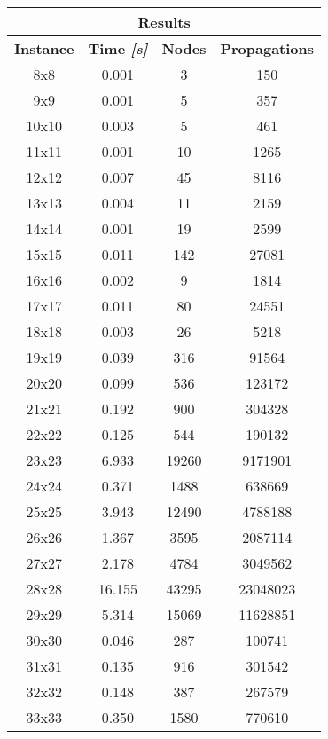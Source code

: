 \begin{center}
    \begin{tabular}{|c|c|c|c|}
        \hline
        \multicolumn{4}{|c|}{\textbf{Results}} \\
        \hline
        \textbf{Instance} & \textbf{Time \textit{[s]}} & \textbf{Nodes} & \textbf{Propagations} \\
        \hline
        8x8 & 0.001 & 3 & 150 \\ \hline
        9x9 & 0.001 & 5 & 357 \\ \hline
        10x10 & 0.003 & 5 & 461 \\ \hline
        11x11 & 0.001 & 10 & 1265 \\ \hline
        12x12 & 0.007 & 45 & 8116 \\ \hline
        13x13 & 0.004 & 11 & 2159 \\ \hline
        14x14 & 0.001 & 19 & 2599 \\ \hline
        15x15 & 0.011 & 142 & 27081 \\ \hline
        16x16 & 0.002 & 9 & 1814 \\ \hline
        17x17 & 0.011 & 80 & 24551 \\ \hline
        18x18 & 0.003 & 26 & 5218 \\ \hline
        19x19 & 0.039 & 316 & 91564 \\ \hline
        20x20 & 0.099 & 536 & 123172 \\ \hline
        21x21 & 0.192 & 900 & 304328 \\ \hline
        22x22 & 0.125 & 544 & 190132 \\ \hline
        23x23 & 6.933 & 19260 & 9171901 \\ \hline
        24x24 & 0.371 & 1488 & 638669 \\ \hline
        25x25 & 3.943 & 12490 & 4788188 \\ \hline
        26x26 & 1.367 & 3595 & 2087114 \\ \hline
        27x27 & 2.178 & 4784 & 3049562 \\ \hline
        28x28 & 16.155 & 43295 & 23048023 \\ \hline
        29x29 & 5.314 & 15069 & 11628851 \\ \hline
        30x30 & 0.046 & 287 & 100741 \\ \hline
        31x31 & 0.135 & 916 & 301542 \\ \hline
        32x32 & 0.148 & 387 & 267579 \\ \hline
        33x33 & 0.350 & 1580 & 770610 \\ \hline

\end{tabular}
\end{center}
